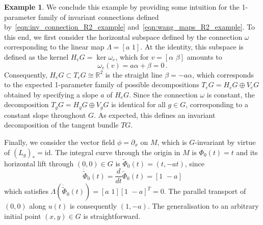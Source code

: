 \documentclass[12pt,a4paper]{article}
\numberwithin{equation}{section}
\newcommand{\id}{\mathrm{id}}
\theoremstyle{plain}
\theoremstyle{definition}
\newtheorem{example}[theorem]{Example}
\theoremstyle{remark}
\begin{document}
\begin{example}
We conclude this example by providing some intuition for the 1-parameter family of invariant connections defined by~\eqref{eqn:inv_connection_R2_example} and~\eqref{eqn:wang_maps_R2_example}. To this end, we first consider the horizontal subspace defined by the connection $\omega$ corresponding to the linear map $\Lambda = [a\,\,1]$. At the identity, this subspace is defined as the kernel $H_eG =\ker \omega_e$, which for $v=[\alpha\,\,\beta]$ amounts to
\begin{equation}
    \omega_e(v) = a\alpha + \beta = 0\,.
\end{equation}
Consequently, $H_eG \subset T_eG \cong \mathbb{R}^2$ is the straight line $\beta = -a \alpha$, which corresponds to the expected 1-parameter family of possible decompositions $T_eG = H_eG \oplus V_eG$ obtained by specifying a slope $a$ of $H_eG$. Since the connection $\omega$ is constant, the decomposition $T_gG = H_gG \oplus V_gG$ is identical for all $g \in G$, corresponding to a constant slope throughout $G$. As expected, this defines an invariant decomposition of the tangent bundle $TG$.

Finally, we consider the vector field $\phi = \partial_x$ on $M$, which is $G$-invariant by virtue of $(L_g)_* = \id$. The integral curve through the origin in $M$ is $\Phi_0(t) = t$ and its horizontal lift through $(0,0) \in G$ is $\tilde{\Phi}_0(t) = (t,-at)$, since
\begin{equation}
    \dot{\tilde{\Phi}}_0(t) = \frac{d}{dt}\tilde{\Phi}_0(t) = [1 \,\, -a]
\end{equation}
which satisfies $\Lambda(\dot{\tilde{\Phi}}_0(t)) = [a\,\,1][1\,\,-a]^T = 0$. The parallel transport of $(0,0)$ along $u(t)$ is consequently $(1,-a)$. The generalisation to an arbitrary initial point $(x,y) \in G$ is straightforward.
\end{example}
\end{document}
